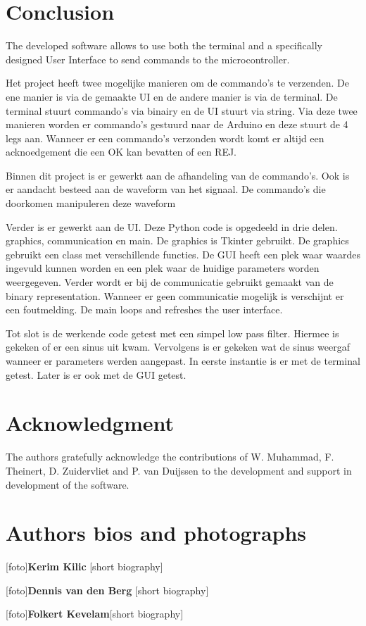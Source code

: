 \documentclass[conference]{IEEEtran}
\begin{document}
\section{Conclusion}
The developed software allows to use both the terminal and a specifically designed User Interface to send commands to the microcontroller.

Het project heeft twee mogelijke manieren om de commando's te verzenden. De ene manier is via de gemaakte UI en de andere manier is via de terminal. De terminal stuurt commando's via binairy en de UI stuurt via string. Via deze twee manieren worden er commando's gestuurd naar de Arduino en deze stuurt de 4 legs aan. Wanneer er een commando's verzonden wordt komt er altijd een acknoedgement die een OK kan bevatten of een REJ.  

Binnen dit project is er gewerkt aan de afhandeling van de commando's. Ook is er aandacht besteed aan de waveform van het signaal. De commando's die doorkomen manipuleren deze waveform

Verder is er gewerkt aan de UI. Deze Python code is opgedeeld in drie delen. graphics, communication en main. De graphics is Tkinter gebruikt. De graphics gebruikt een class met verschillende functies. De GUI heeft een plek waar waardes ingevuld kunnen worden en een plek waar de huidige parameters worden weergegeven. Verder wordt er bij de communicatie gebruikt gemaakt van de binary representation. Wanneer er geen communicatie mogelijk is verschijnt er een foutmelding. De main loops and refreshes the user interface. 

Tot slot is de werkende code getest met een simpel low pass filter. Hiermee is gekeken of er een sinus uit kwam. Vervolgens is er gekeken wat de sinus weergaf wanneer er parameters werden aangepast. In eerste instantie is er met de terminal getest. Later is er ook met de GUI getest.




\section*{Acknowledgment}
The authors gratefully acknowledge the contributions of W. Muhammad, F. Theinert, D. Zuidervliet and P. van Duijssen to the development and support in development of the software.







\section{Authors bios and photographs}

[foto]\textbf{Kerim Kilic} [short biography]

[foto]\textbf{Dennis van den Berg} [short biography]

[foto]\textbf{Folkert Kevelam}[short biography]
\end{document}
